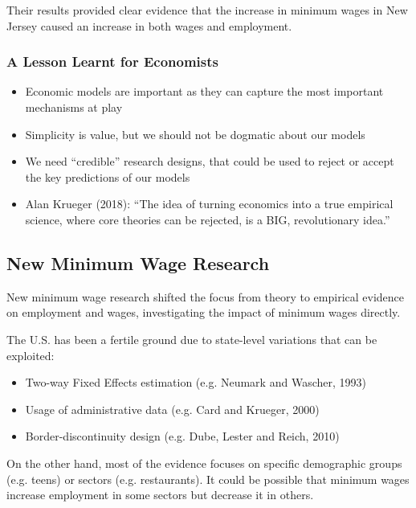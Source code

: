             Their results provided clear evidence that the increase in minimum wages in New Jersey caused an increase in both wages and employment.
            
        \subsubsection{A Lesson Learnt for Economists}
            \begin{itemize}
                \item Economic models are important as they can capture the most important mechanisms at play
                \item Simplicity is value, but we should not be dogmatic about our models
                \item We need “credible” research designs, that could be used to reject or accept the key predictions of our models
                \item Alan Krueger (2018): “The idea of turning economics into a true empirical science, where core theories can be rejected, is a BIG, revolutionary idea.”
            \end{itemize}
    
    \subsection{New Minimum Wage Research}
        New minimum wage research shifted the focus from theory to  empirical evidence on employment and wages, investigating the impact of minimum wages directly.
        
        The U.S. has been a fertile ground due to state-level variations that can be exploited:
        \begin{itemize}
            \item Two-way Fixed Effects estimation (e.g. Neumark and Wascher, 1993)
            \item Usage of administrative data (e.g. Card and Krueger, 2000)
            \item Border-discontinuity design (e.g. Dube, Lester and Reich, 2010)
        \end{itemize}
        
        On the other hand, most of the evidence focuses on specific demographic groups (e.g. teens) or sectors (e.g. restaurants). It could be possible that minimum wages increase employment in some sectors but decrease it in others.
        
